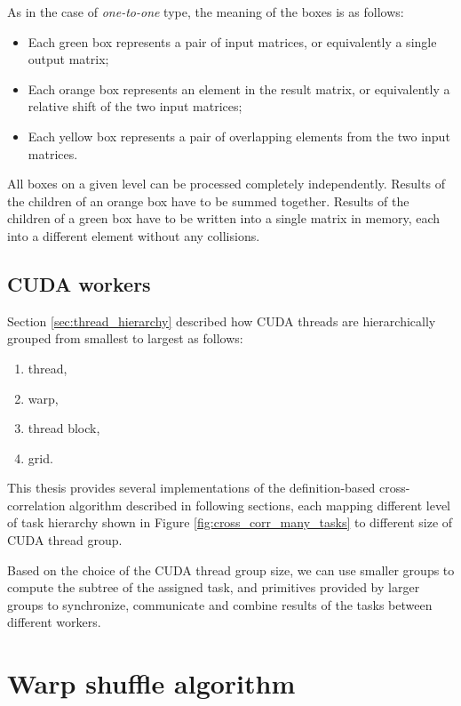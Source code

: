As in the case of \textit{one-to-one} type, the meaning of the boxes is as follows:

\begin{itemize}
	\item Each green box represents a pair of input matrices, or equivalently a single output matrix;
	\item Each orange box represents an element in the result matrix, or equivalently a relative shift of the two input matrices;
	\item Each yellow box represents a pair of overlapping elements from the two input matrices.
\end{itemize}

All boxes on a given level can be processed completely independently. Results of the children of an orange box have to be summed together. Results of the children of a green box have to be written into a single matrix in memory, each into a different element without any collisions.


\subsection{CUDA workers}

Section \ref{sec:thread_hierarchy} described how CUDA threads are hierarchically grouped from smallest to largest as follows:

\begin{enumerate}
	\item thread,
	\item warp,
	\item thread block,
	\item grid.
\end{enumerate}

This thesis provides several implementations of the definition-based cross-correlation algorithm described in following sections, each mapping different level of task hierarchy shown in Figure \ref{fig:cross_corr_many_tasks} to different size of CUDA thread group.

Based on the choice of the CUDA thread group size, we can use smaller groups to compute the subtree of the assigned task, and primitives provided by larger groups to synchronize, communicate and combine results of the tasks between different workers.

\section{Warp shuffle algorithm}

